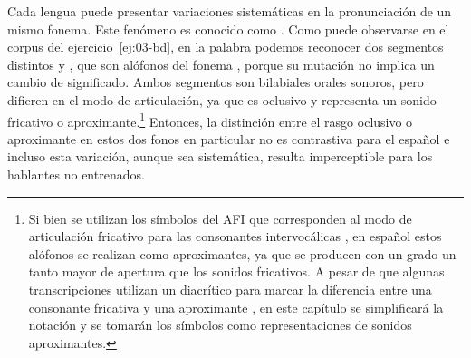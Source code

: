 Cada lengua puede presentar variaciones sistemáticas en la pronunciación de un
mismo fonema. Este fenómeno es conocido como . Como puede
observarse en el corpus del ejercicio~\ref{ej:03-bd}, en la palabra
  podemos reconocer dos segmentos distintos  y
, que son alófonos del fonema , porque su mutación no implica un
cambio de significado. Ambos segmentos son bilabiales orales sonoros, pero
difieren en el modo de articulación, ya que  es oclusivo y 
representa un sonido fricativo o aproximante.\footnote{Si bien se utilizan los
símbolos del AFI que corresponden al modo de articulación fricativo para las
consonantes intervocálicas , en español estos alófonos se realizan
como aproximantes, ya que se producen con un grado un tanto mayor de apertura
que los sonidos fricativos. A pesar de que algunas transcripciones utilizan un
diacrítico para marcar la diferencia entre una consonante fricativa  y
una aproximante , en este capítulo se simplificará la notación y se
tomarán los símbolos  como representaciones de sonidos
aproximantes.} Entonces, la distinción entre el rasgo oclusivo o aproximante en
estos dos fonos en particular no es contrastiva para el español e incluso esta
variación, aunque sea sistemática, resulta imperceptible para los hablantes no
entrenados.


